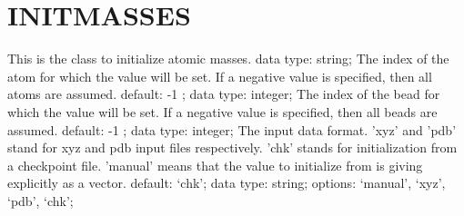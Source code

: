 \section{INITMASSES}
\label{INITMASSES}
\begin{ipifield}{}%
{This is the class to initialize atomic masses.}%
{data type: string; }%
{%
{The index of the atom for which the value will be set. If a negative value is specified, then all atoms are assumed.}%
{default:  -1 ; data type: integer; }%
%
{The index of the bead for which the value will be set. If a negative value is specified, then all beads are assumed.}%
{default:  -1 ; data type: integer; }%
%
{The input data format. 'xyz' and 'pdb' stand for xyz and pdb input files respectively. 'chk' stands for initialization from a checkpoint file. 'manual' means that the value to initialize from is giving explicitly as a vector.}%
{default: `chk'; data type: string; options: `manual', `xyz', `pdb', `chk'; }%
}
\end{ipifield}
